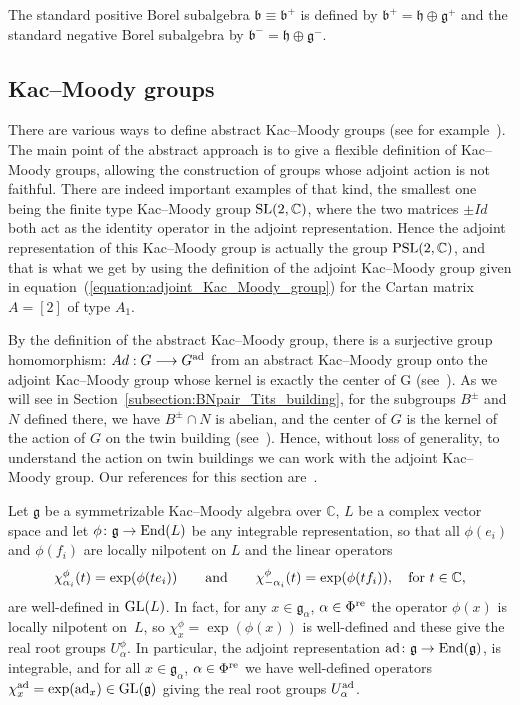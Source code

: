 \documentclass[pdftex]{sigma}
\numberwithin{equation}{section}
\def\C{{\mathbb C}}
\def\a{\alpha}
\def\roots{{\Phi}}
\def\g{\mathfrak{g}}
\def\b{\mathfrak{b}}
\def\fg{\mathfrak{g}}
\def\h{\mathfrak{h}}
\begin{document}
The standard positive Borel subalgebra $\b\equiv\b^+$ is defined by $\b^+=\h\oplus \g^+$ and the standard negative Borel subalgebra by $\b^-=\h\oplus \g^-$.

\subsection{Kac--Moody groups}

There are various ways to define abstract Kac--Moody groups
(see for example~\cite{KacPeterson85c, Marquis18, Remy02,Tits87}).
The main point of the abstract approach is to give a flexible definition of Kac--Moody groups, allowing the construction of groups whose adjoint action is not faithful. There are indeed important examples of that kind, the smallest one being the finite type Kac--Moody group ${\rm SL}(2, \C)$, where the two matrices $\pm Id$ both act as the identity operator in the adjoint representation. Hence the adjoint representation of this Kac--Moody group is actually the group ${\rm PSL}(2, \C)$, and that is what we get by using the definition of the adjoint Kac--Moody group given in equation~(\ref{equation:adjoint_Kac_Moody_group}) for the Cartan matrix $A = [2]$ of type $A_1$.

By the definition of the abstract Kac--Moody group, there is a surjective group homomorphism: $Ad: G\longrightarrow G^{\rm ad}$ from an abstract Kac--Moody group onto the adjoint Kac--Moody group whose kernel is exactly the center of G (see~\cite[Proposition~9.6.2]{Remy02}). As we will see in Section~\ref{subsection:BNpair_Tits_building}, for the subgroups $B^\pm$ and $N$ defined there, we have
$B^\pm\cap N$ is abelian, and the center of $G$ is the kernel of the action of $G$ on the twin building (see~\cite[Lemma~1.7]{Caprace09}). Hence, without loss of generality, to understand the action on twin buildings we can work with the adjoint Kac--Moody group.
Our references for this section are~\cite{ KacPeterson85c,Kumar02, Marquis18, Moody95}.

Let $\g$ be a symmetrizable Kac--Moody algebra over $\C$, $L$ be a complex vector space and let
$\phi\colon \fg\to {\rm End}(L)$ be any integrable representation, so that
all $\phi(e_i)$ and $\phi(f_i)$ are locally nilpotent on $L$ and the linear operators
\[\chi^\phi_{{\a}_i}(t) = \exp(\phi(te_i))\qquad\hbox{and}\qquad \chi^\phi_{{-\a}_i}(t) = \exp(\phi(tf_i)),\quad \text{for} \ t\in\C,\]
are well-defined in ${\rm GL}(L)$. In fact, for any $x\in \g_{\a}$, $\a\in\roots^{\rm re}$ the operator $\phi(x)$ is locally nilpotent on~$L$, so
$\chi^\phi_x = \exp(\phi(x))$ is well-defined and these give the real root groups $U_\a^\phi$. In particular, the adjoint representation
${\rm ad}\colon \fg \to {\rm End}(\g)$, is integrable, and for all $x\in \g_{\a}$, $\a\in\roots^{\rm re}$ we have well-defined operators $\chi^{\rm ad}_x = \exp({\rm ad}_x)\in {\rm GL}(\g)$ giving the real root groups $U_\a^{\rm ad}$.
\end{document}
